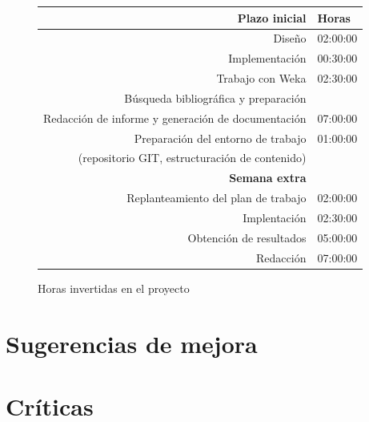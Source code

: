 \documentclass[a4paper]{report}
\begin{document}
	\begin{figure}[htbp]
	
		\begin{center}
			\begin{tabular}{|r|r|}
				\hline
				\textbf{Plazo inicial} & \multicolumn{1}{l|}{\textbf{Horas}} \\ \hline
				Diseño & 02:00:00 \\ \hline
				Implementación & 00:30:00 \\ \hline
				Trabajo con Weka & 02:30:00 \\ \hline
				Búsqueda bibliográfica y preparación & \multicolumn{1}{l|}{} \\ \hline
				Redacción de informe y generación de documentación & 07:00:00 \\ \hline
				Preparación del entorno de trabajo & 01:00:00 \\
				(repositorio GIT, estructuración de contenido) & \multicolumn{1}{l|}{} \\ \hline
				\textbf{Semana extra} & \multicolumn{1}{l|}{} \\ \hline
				Replanteamiento del plan de trabajo & 02:00:00 \\ \hline
				Implentación & 02:30:00 \\ \hline
				Obtención de resultados & 05:00:00 \\ \hline
				Redacción & 07:00:00 \\ \hline
			\end{tabular}
		\end{center}
			\caption{Horas invertidas en el proyecto}
		\label{horas}
	\end{figure}
	
	
	\section*{Sugerencias de mejora}
	
	\section*{Críticas}
\end{document}
